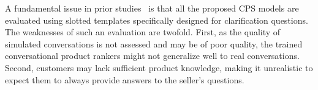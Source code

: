 A fundamental issue in prior studies~\cite{zhang2018towards,bi2019conversational,zou2022learning} is that all the proposed CPS models are evaluated using slotted templates specifically designed for clarification questions. 
The weaknesses of such an evaluation are twofold. First, as the quality of simulated conversations is not assessed and may be of poor quality, the trained conversational product rankers might not generalize well to real conversations. Second, customers may lack sufficient product knowledge, making it unrealistic to expect them to always provide answers to the seller's questions. %

